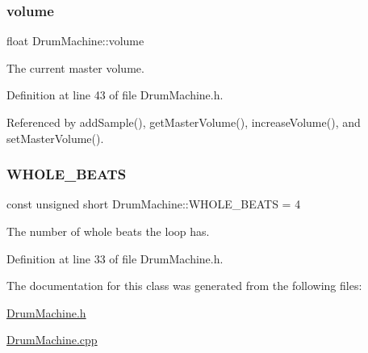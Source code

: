 \subsubsection{\texorpdfstring{volume}{volume}}
{\footnotesize\ttfamily float Drum\+Machine\+::volume\hspace{0.3cm}{\ttfamily [private]}}



The current master volume. 



Definition at line 43 of file Drum\+Machine.\+h.



Referenced by add\+Sample(), get\+Master\+Volume(), increase\+Volume(), and set\+Master\+Volume().

\mbox{\label{class_drum_machine_a54e06658e13970dc7679051e8194f546}} 
\subsubsection{\texorpdfstring{W\+H\+O\+L\+E\+\_\+\+B\+E\+A\+TS}{WHOLE\_BEATS}}
{\footnotesize\ttfamily const unsigned short Drum\+Machine\+::\+W\+H\+O\+L\+E\+\_\+\+B\+E\+A\+TS = 4\hspace{0.3cm}{\ttfamily [private]}}



The number of whole beats the loop has. 



Definition at line 33 of file Drum\+Machine.\+h.



The documentation for this class was generated from the following files\+:\begin{DoxyCompactItemize}
\item 
\hyperlink{_drum_machine_8h}{Drum\+Machine.\+h}\item 
\hyperlink{_drum_machine_8cpp}{Drum\+Machine.\+cpp}\end{DoxyCompactItemize}
